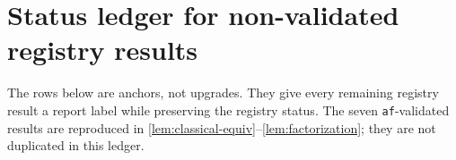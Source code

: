\section{Status ledger for non-validated registry results}\label{sec:status-ledger}

The rows below are anchors, not upgrades.  They give every remaining
registry result a report label while preserving the registry status.
The seven \texttt{af}-validated results are reproduced in
\ref{lem:classical-equiv}--\ref{lem:factorization}; they are not
duplicated in this ledger.

